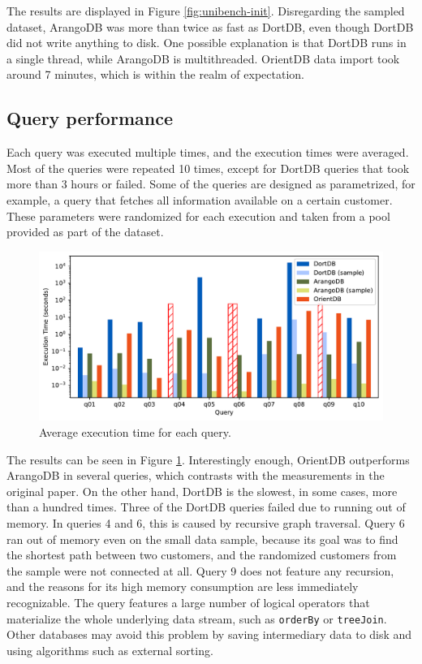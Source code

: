 The results are displayed in Figure \ref{fig:unibench-init}. Disregarding the sampled dataset, ArangoDB was more than twice as fast as DortDB, even though DortDB did not write anything to disk. One possible explanation is that DortDB runs in a single thread, while ArangoDB is multithreaded. OrientDB data import took around 7 minutes, which is within the realm of expectation.

\subsection{Query performance}

Each query was executed multiple times, and the execution times were averaged. Most of the queries were repeated 10 times, except for DortDB queries that took more than 3 hours or failed. Some of the queries are designed as parametrized, for example, a query that fetches all information available on a certain customer. These parameters were randomized for each execution and taken from a pool provided as part of the dataset.

\begin{figure}[!ht]
    \centering
    \includegraphics[width=\linewidth]{img/unibench-execution.pdf}
    \caption{Average execution time for each query.}
    \label{fig:unibench-execution}
\end{figure}

The results can be seen in Figure \ref{fig:unibench-execution}. Interestingly enough, OrientDB outperforms ArangoDB in several queries, which contrasts with the measurements in the original paper. On the other hand, DortDB is the slowest, in some cases, more than a hundred times. Three of the DortDB queries failed due to running out of memory. In queries 4 and 6, this is caused by recursive graph traversal. Query 6 ran out of memory even on the small data sample, because its goal was to find the shortest path between two customers, and the randomized customers from the sample were not connected at all. Query 9 does not feature any recursion, and the reasons for its high memory consumption are less immediately recognizable. The query features a large number of logical operators that materialize the whole underlying data stream, such as \texttt{orderBy} or \texttt{treeJoin}. Other databases may avoid this problem by saving intermediary data to disk and using algorithms such as external sorting.

